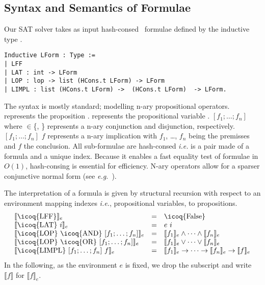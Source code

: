 \documentclass[utf8,a4paper,UKenglish,cleveref, autoref, thm-restate]{lipics-v2019}
\newcommand{\mcoq}[1]{\mbox{\icoq{#1}}}
\begin{document}
\subsection{Syntax and Semantics of Formulae}
\label{sec:syntax}
Our SAT solver takes as input hash-consed~\cite{Allen-hcons} formulae defined by the inductive type .
\begin{verbatim}
Inductive LForm : Type :=
| LFF
| LAT : int -> LForm
| LOP : lop -> list (HCons.t LForm) -> LForm
| LIMPL : list (HCons.t LForm) ->  (HCons.t LForm)  -> LForm.
\end{verbatim}
The syntax is mostly standard; modelling n-ary propositional operators.
%
 represents the proposition . 
 represents the propositional variable .
%
 $[f_1; \dots; f_n]$ where  $\in$\{,
\} represents a n-ary conjunction and disjunction, respectively.
%
 $[f_1; \dots; f_n]$ $f$ represents a n-ary implication
with $f_1$, \dots, $f_n$ being the premisses and $f$ the conclusion.
%
All sub-formulae are hash-consed \emph{i.e.} 
is a pair made of a formula and a unique index.
%
Because it enables a fast equality test of formulae in $O(1)$, hash-consing is essential for efficiency.
%
N-ary operators allow for a sparser conjunctive normal form (see \emph{e.g.}~\cite{LescuyerC09}).

The interpretation of a formula  is given by structural recursion with respect
to an environment  mapping indexes \emph{i.e.}, propositional variables, to
propositions.
\[
  \begin{array}{lcl}
    \llbracket \mcoq{LFF} \rrbracket_e &=& \mcoq{False} \\
    \llbracket \mcoq{LAT}\ i \rrbracket_e &=& e\ i \\
    \llbracket \mcoq{LOP}\  \mcoq{AND}\ [f_1;\dots;f_n] \rrbracket_e &=& \llbracket f_1 \rrbracket_e \land \dots\land \llbracket f_n \rrbracket_e\\
    \llbracket \mcoq{LOP}\  \mcoq{OR}\  [f_1;\dots;f_n] \rrbracket_e &=& %
    \llbracket f_1 \rrbracket_e \vee \dots\vee \llbracket f_n \rrbracket_e\\
    \llbracket \mcoq{LIMPL}\ [f_1;\dots;f_n]\  f \rrbracket_e &=& \llbracket f_1\rrbracket_e \rightarrow \dots \rightarrow \llbracket f_n \rrbracket_e \to \llbracket f \rrbracket_e \\
  \end{array}
\]
In the following, as the environment $e$ is fixed, we drop the
subscript and write $\llbracket f \rrbracket$ for $\llbracket f \rrbracket_e$.
\end{document}
